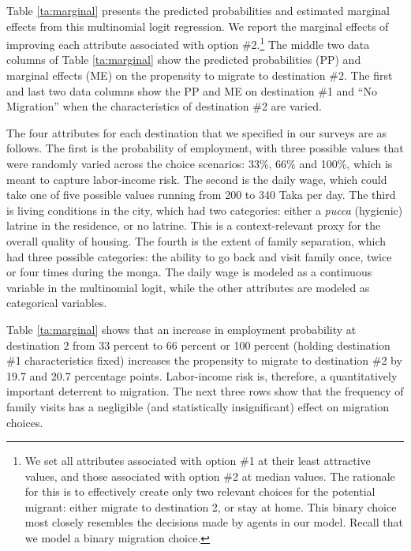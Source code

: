 \documentclass[12pt,pdftex]{article}
\begin{document}
Table \ref{ta:marginal} presents the predicted probabilities and estimated marginal effects from this multinomial logit regression. We report the marginal effects of improving each attribute associated with option \#2.\footnote{We set all attributes associated with option \#1 at their least attractive values, and those associated with option \#2 at median values.  The rationale for this is to effectively create only two relevant choices for the potential migrant: either migrate to destination 2, or stay at home. This binary choice most closely resembles the decisions made by agents in our model. Recall that we model a binary migration choice.} The middle two data columns of Table \ref{ta:marginal} show the predicted probabilities (PP) and marginal effects (ME) on the propensity to migrate to destination \#2. The first and last two data columns show the PP and ME on destination \#1 and ``No Migration'' when the characteristics of destination \#2 are varied.

The four attributes for each destination that we specified in our surveys are as follows. The first is the probability of employment, with three possible values that were randomly varied across the choice scenarios: 33\%, 66\% and 100\%, which is meant to capture labor-income risk. The second is the daily wage, which could take one of five possible values running from 200 to 340 Taka per day. The third is living conditions in the city, which had two categories: either a \emph{pucca} (hygienic) latrine in the residence, or no latrine. This is a context-relevant proxy for the overall quality of housing. The fourth is the extent of family separation, which had three possible categories: the ability to go back and visit family once, twice or four times during the monga. The daily wage is modeled as a continuous variable in the multinomial logit, while the other attributes are modeled as categorical variables.

Table \ref{ta:marginal} shows that an increase in employment probability at destination 2 from 33 percent to 66 percent or 100 percent (holding destination \#1 characteristics fixed) increases the propensity to migrate to destination \#2 by 19.7 and 20.7 percentage points. Labor-income risk is, therefore, a quantitatively important deterrent to migration. The next three rows show that the frequency of family visits has a negligible (and statistically insignificant) effect on migration choices.
\end{document}
